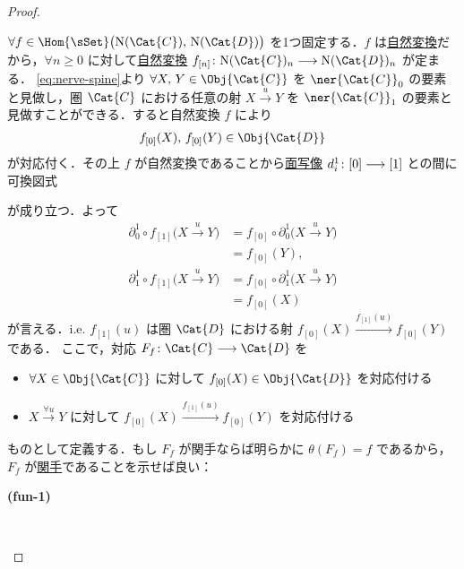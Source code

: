 \documentclass[TQFT_main]{subfiles}
\begin{document}
\begin{proof}
\begin{description}
        $\forall f \in \Hom{\sSet} \bigl( \mathrm{N}(\Cat{C}),\, \mathrm{N}(\Cat{D}) \bigr)$ を1つ固定する．$f$ は\hyperref[def:nat]{自然変換}だから，$\forall n \ge 0$ に対して\hyperref[def:nat]{自然変換} $f_{[n]} \colon \mathrm{N}(\Cat{C})_n \lto \mathrm{N}(\Cat{D})_n$ が定まる．
        \eqref{eq:nerve-spine}より $\forall X,\, Y \in \Obj{\Cat{C}}$ を $\ner{\Cat{C}}_0$ の要素と見做し，圏 $\Cat{C}$ における任意の射 $X \xrightarrow{u} Y$ を $\ner{\Cat{C}}_1$ の要素と見做すことができる．すると自然変換 $f$ により
        \begin{align}
            f_{[0]} (X),\, f_{[0]} (Y) \in \Obj{\Cat{D}}
        \end{align}
        が対応付く．その上 $f$ が自然変換であることから\hyperref[def:simplex-cat]{面写像} $d_i^1 \colon [0] \longrightarrow [1]$ との間に可換図式
        \begin{center}
        \end{center}
        が成り立つ．よって
        \begin{align}
            \partial_0^1 \circ f_{[1]}\bigl( X \xrightarrow{u} Y \bigr) 
            &= f_{[0]} \circ \partial_0^1 \bigl( X \xrightarrow{u} Y \bigr)  \\
            &= f_{[0]} (Y), \\
            \partial_1^1 \circ f_{[1]}\bigl( X \xrightarrow{u} Y \bigr) 
            &= f_{[0]} \circ \partial_1^1 \bigl( X \xrightarrow{u} Y \bigr) \\
            &= f_{[0]} (X)
        \end{align}
        が言える．i.e. $f_{[1]}(u)$ は圏 $\Cat{D}$ における射 $f_{[0]}(X) \xrightarrow{f_{[1]}(u)} f_{[0]} (Y)$ である．
        ここで，対応 $F_f \colon \Cat{C} \lto \Cat{D}$ を
        \begin{itemize}
            \item $\forall X \in \Obj{\Cat{C}}$ に対して $f_{[0]}(X) \in \Obj{\Cat{D}}$ を対応付ける
            \item $X \xrightarrow{\forall u} Y$ に対して $f_{[0]}(X) \xrightarrow{f_{[1]}(u)} f_{[0]}(Y)$ を対応付ける
        \end{itemize}
        ものとして定義する．もし $F_f$ が関手ならば明らかに $\theta(F_f) = f$ であるから，$F_f$ が\hyperref[def:functor]{関手}であることを示せば良い：
        \begin{description}
            \item[\textbf{(fun-1)}]　
            

\end{description}
\end{description}
\end{proof}
\end{document}
